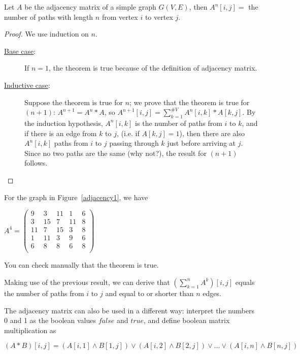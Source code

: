  \begin{theorem}
\label{aantalpathen}
Let $A$ be the adjacency matrix of a simple graph $G(V,E)$,
then
$A^{n}[i,j] = $ the number of paths with length $n$ from vertex $i$ to vertex
$j$.
\end{theorem}
\begin{proof} We use induction on $n$. 
\begin{description}
\item[\underline{Base case}:] If $n=1$, the theorem is true
because of the definition of adjacency matrix.

\item[\underline{Inductive case}:]
Suppose the theorem is true for $n$; we prove that the theorem is true
for $(n+1)$: $A^{n+1}=A^{n}*A$, so $A^{n+1}[i,j] = \sum_{k=1}^{\#V}
A^{n}[i,k]*A[k,j]$. By the induction hypothesis, $A^{n}[i,k]$ is the
number of paths from $i$ to $k$, and if there is an edge from $k$ to
$j$, (i.e. if $A[k,j] = 1$), then there are also $A^{n}[i,k]$ paths
from $i$ to $j$ passing through $k$ just before arriving at
$j$. Since no two paths are the same (why not?), the result for
$(n+1)$ follows.
\end{description}
\end{proof}

For the graph in Figure~\ref{adjacency1}, we have
\begin{center}
$A^{4} = \left(
\begin{array}{ccccc}
9 & 3 & 11& 1 & 6\\
3 & 15& 7 & 11& 8\\
11& 7 & 15& 3 & 8\\
1 & 11& 3 & 9 & 6\\
6 & 8 & 8 & 6 & 8\\
\end{array}
\right)
$
\end{center}

You can check manually that the theorem is true.

Making use of the previous result, we can derive that $(\sum_{k=1}^{n}
A^{k})[i,j]$ equals the number of paths from $i$ to $j$ and equal to
or shorter than $n$ edges.

The adjacency matrix can also be used in a different way: interpret
the numbers 0 and 1 as the boolean values $false$ and $true$, and
define boolean matrix multiplication as

\[(A*B)[i,j] = (A[i,1] \wedge B[1,j]) \vee (A[i,2] \wedge B[2,j]) \vee
\ldots \vee (A[i,n] \wedge B[n,j])\]


